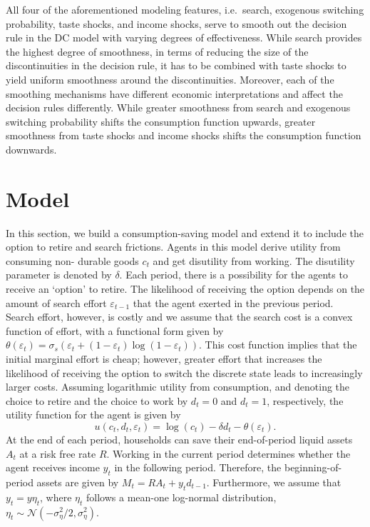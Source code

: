 \documentclass[11pt]{article}
\newcommand{\eff}{\varepsilon}
\begin{document}
All four of the aforementioned modeling features, i.e.\ search, exogenous switching
probability, taste shocks, and income shocks, serve to smooth out the decision rule in
the DC model with varying degrees of effectiveness. While search provides the highest
degree of smoothness, in terms of reducing the size of the discontinuities in the decision
rule, it has to be combined with taste shocks to yield uniform smoothness around the
discontinuities. Moreover, each of the smoothing mechanisms have different economic
interpretations and affect the decision rules differently. While greater smoothness from
search and exogenous switching probability shifts the consumption function upwards,
greater smoothness from taste shocks and income shocks shifts the consumption function
downwards.


\section{Model}
In this section, we build a consumption-saving model and extend it to include the option
to retire and search frictions. Agents in this model derive utility from consuming non-
durable goods $c_t$ and get disutility from working. The disutility parameter is denoted by
$\delta$. Each period, there is a possibility for the agents to receive an `option' to retire. The
likelihood of receiving the option depends on the amount of search effort $\eff_{t-1}$ that the
agent exerted in the previous period. Search effort, however, is costly and we assume
that the search cost is a convex function of effort, with a functional form given by
$\theta(\eff_t) = \sigma_s \left(\eff_t + (1 - \eff_t) \log (1 - \eff_t)\right)$. This cost function implies that the initial marginal
effort is cheap; however, greater effort that increases the likelihood of receiving the option
to switch the discrete state leads to increasingly larger costs. Assuming logarithmic
utility from consumption, and denoting the choice to retire and the choice to work by
$d_t = 0$ and $d_t = 1$, respectively, the utility function for the agent is given by
\begin{equation}
u(c_t, d_t, \eff_t) = \log(c_t) - \delta d_t - \theta(\eff_t).
\end{equation}
At the end of each period, households can save their end-of-period liquid assets $A_t$ at a
risk free rate $R$. Working in the current period determines whether the agent receives
income $y_t$ in the following period. Therefore, the beginning-of-period assets are given by
$M_t = R A_t + y_t d_{t-1}$. Furthermore, we assume that $y_t = y \eta_t$, where $\eta_t$ follows a mean-one
log-normal distribution, $\eta_t \sim \mathcal{N}(-\sigma_\eta^2/2, \sigma_\eta^2)$.
\end{document}
